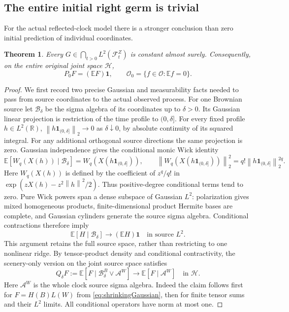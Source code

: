 \documentclass[11pt]{article}
\newtheorem{theorem}{Theorem}[section]
\theoremstyle{remark}\newtheorem{remark}[theorem]{Remark}
\newcommand{\R}{\mathbb R}
\newcommand{\E}{\mathbb E}
\newcommand{\one}{\mathbf1}
\newcommand{\norm}[1]{\left\lVert#1\right\rVert}
\newcommand{\HH}{\mathcal H}
\newcommand{\OO}{\mathcal O}
\begin{document}
\subsection*{The entire initial right germ is trivial}
For the actual reflected-clock model there is a stronger conclusion
than zero initial prediction of individual coordinates.
\begin{theorem}\label{thm:initialgerm}
Every $G\in\bigcap_{t>0}L^2(\mathcal F_t^Z)$ is constant almost
surely. Consequently, on the entire original joint space $\HH$,
\begin{equation}\label{eq:wholeinitial}
 P_0F=(\E F)\one,\qquad
 \OO_0=\{f\in\OO:\E f=0\}.
\end{equation}
\end{theorem}
\begin{proof}
We first record two precise Gaussian and measurability facts needed
to pass from source coordinates to the actual observed process.
For one Brownian source let $\mathcal B_\delta$ be the sigma algebra
of its coordinates up to $\delta>0$. Its Gaussian linear projection
is restriction of the time profile to $(0,\delta]$. For every fixed
profile $h\in L^2(\R)$,
$\norm{h\one_{(0,\delta]}}_2\to0$ as $\delta\downarrow0$,
by absolute continuity of its squared integral. For any additional
orthogonal source directions the same projection is zero.
Gaussian independence gives the conditional monic Wick identity
\[
 \E[W_q(X(h))\mid\mathcal B_\delta]
       =W_q(X(h\one_{(0,\delta]})),\qquad
 \norm{W_q(X(h\one_{(0,\delta]}))}_2^2
       =q!\norm{h\one_{(0,\delta]}}_2^{2q}.
\]
Here $W_q(X(h))$ is defined by the coefficient of $z^q/q!$ in
$\exp(zX(h)-z^2\norm h^2/2)$. Thus positive-degree conditional terms tend to zero. Pure Wick
powers span a dense subspace of Gaussian $L^2$: polarization gives
mixed homogeneous products, finite-dimensional product Hermite
bases are complete, and Gaussian cylinders generate the source
sigma algebra. Conditional contractions therefore imply
\begin{equation}\label{eq:shrinkingGaussian}
 \E[H\mid\mathcal B_\delta]\longrightarrow(\E H)\one
                     \quad\text{in source }L^2.
\end{equation}
This argument retains the full source space, rather than restricting
to one nonlinear ridge. By tensor-product density and conditional
contractivity, the scenery-only version on the joint source space
satisfies
\begin{equation}\label{eq:sceneryvacuum}
 Q_\delta F:=\E[F\mid\mathcal B_\delta^B\vee\mathcal A^W]
      \longrightarrow\E[F\mid\mathcal A^W]\quad\text{in }\HH.
\end{equation}
Here $\mathcal A^W$ is the whole clock source sigma algebra.
Indeed the claim follows first for $F=H(B)L(W)$ from
\eqref{eq:shrinkingGaussian}, then for finite tensor sums and their
$L^2$ limits. All conditional operators have norm at most one.


\end{proof}
\end{document}
